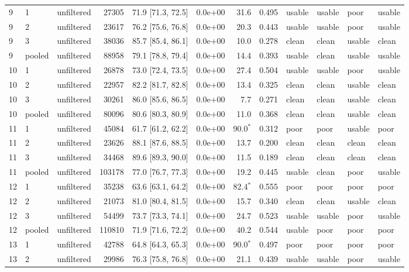 \begin{longtable}{lllrrrrrllll}
9 & 1 & unfiltered & 27305 & 71.9 [71.3, 72.5] & 0.0e+00 & 31.6 & 0.495 & usable & usable & poor & usable \\
9 & 2 & unfiltered & 23617 & 76.2 [75.6, 76.8] & 0.0e+00 & 20.3 & 0.443 & usable & usable & poor & usable \\
9 & 3 & unfiltered & 38036 & 85.7 [85.4, 86.1] & 0.0e+00 & 10.0 & 0.278 & clean & clean & usable & clean \\
9 & pooled & unfiltered & 88958 & 79.1 [78.8, 79.4] & 0.0e+00 & 14.4 & 0.393 & usable & clean & usable & usable \\
10 & 1 & unfiltered & 26878 & 73.0 [72.4, 73.5] & 0.0e+00 & 27.4 & 0.504 & usable & usable & poor & usable \\
10 & 2 & unfiltered & 22957 & 82.2 [81.7, 82.8] & 0.0e+00 & 13.4 & 0.325 & clean & clean & usable & clean \\
10 & 3 & unfiltered & 30261 & 86.0 [85.6, 86.5] & 0.0e+00 & 7.7 & 0.271 & clean & clean & usable & clean \\
10 & pooled & unfiltered & 80096 & 80.6 [80.3, 80.9] & 0.0e+00 & 11.0 & 0.368 & clean & clean & usable & clean \\
11 & 1 & unfiltered & 45084 & 61.7 [61.2, 62.2] & 0.0e+00 & 90.0$^\ast$ & 0.312 & poor & poor & usable & poor \\
11 & 2 & unfiltered & 23626 & 88.1 [87.6, 88.5] & 0.0e+00 & 13.7 & 0.200 & clean & clean & clean & clean \\
11 & 3 & unfiltered & 34468 & 89.6 [89.3, 90.0] & 0.0e+00 & 11.5 & 0.189 & clean & clean & clean & clean \\
11 & pooled & unfiltered & 103178 & 77.0 [76.7, 77.3] & 0.0e+00 & 19.2 & 0.445 & usable & clean & poor & usable \\
12 & 1 & unfiltered & 35238 & 63.6 [63.1, 64.2] & 0.0e+00 & 82.4$^\ast$ & 0.555 & poor & poor & poor & poor \\
12 & 2 & unfiltered & 21073 & 81.0 [80.4, 81.5] & 0.0e+00 & 15.7 & 0.340 & clean & clean & usable & clean \\
12 & 3 & unfiltered & 54499 & 73.7 [73.3, 74.1] & 0.0e+00 & 24.7 & 0.523 & usable & usable & poor & usable \\
12 & pooled & unfiltered & 110810 & 71.9 [71.6, 72.2] & 0.0e+00 & 40.2 & 0.544 & usable & poor & poor & poor \\
13 & 1 & unfiltered & 42788 & 64.8 [64.3, 65.3] & 0.0e+00 & 90.0$^\ast$ & 0.497 & poor & poor & poor & poor \\
13 & 2 & unfiltered & 29986 & 76.3 [75.8, 76.8] & 0.0e+00 & 21.1 & 0.439 & usable & usable & poor & usable \\

\end{longtable}
